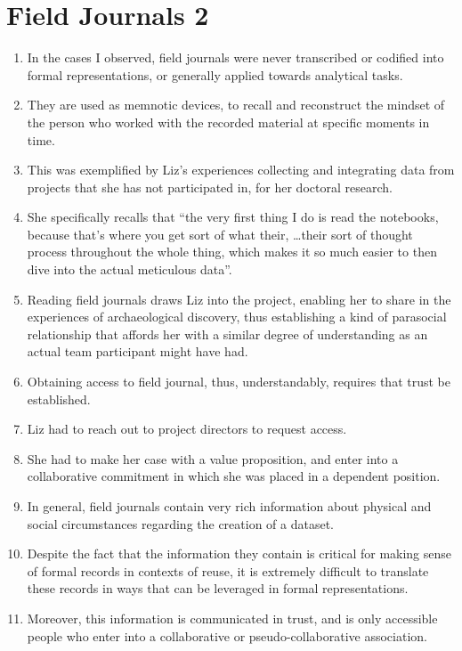 \documentclass[12pt]{article}
\begin{document}
\section{Field Journals 2}
\begin{enumerate}
  \item In the cases I observed, field journals were never transcribed or codified into formal representations, or generally applied towards analytical tasks.
  \item They are used as memnotic devices, to recall and reconstruct the mindset of the person who worked with the recorded material at specific moments in time.
  \item This was exemplified by Liz's experiences collecting and integrating data from projects that she has not participated in, for her doctoral research.
  \item She specifically recalls that ``the very first thing I do is read the notebooks, because that’s where you get sort of what their, \dots their sort of thought process throughout the whole thing, which makes it so much easier to then dive into the actual meticulous data''.
  \item Reading field journals draws Liz into the project, enabling her to share in the experiences of archaeological discovery, thus establishing a kind of parasocial relationship that affords her with a similar degree of understanding as an actual team participant might have had.
  \item Obtaining access to field journal, thus, understandably, requires that trust be established.
  \item Liz had to reach out to project directors to request access.
  \item She had to make her case with a value proposition, and enter into a collaborative commitment in which she was placed in a dependent position.

  \item In general, field journals contain very rich information about physical and social circumstances regarding the creation of a dataset.
  \item Despite the fact that the information they contain is critical for making sense of formal records in contexts of reuse, it is extremely difficult to translate these records in ways that can be leveraged in formal representations.
  \item Moreover, this information is communicated in trust, and is only accessible people who enter into a collaborative or pseudo-collaborative association.
\end{enumerate}
\end{document}
